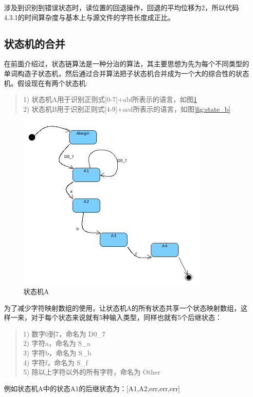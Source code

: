 涉及到识别到错误状态时，读位置的回退操作，回退的平均位移为2，所以代码4.3.1的时间算杂度与基本上与源文件的字符长度成正比。
  
\subsection{状态机的合并}
在前面介绍过，状态链算法是一种分治的算法，其主要思想为先为每个不同类型的单词构造子状态机，然后通过合并算法把子状态机合并成为一个大的综合性的状态机。假设现在有两个状态机:
\begin{quote}
1) 状态机A用于识别正则式[0-7]+abf所表示的语言，如图\ref{fig:state_a}\\
2) 状态机B用于识别正则式[4-9]+acd所表示的语言，如图\ref{fig:state_b}
\end{quote}
\begin{figure}
 \centering
 \includegraphics[scale=1]{s_a.png}
 \caption{状态机A}
 \label{fig:state_a}
\end{figure}
为了减少字符映射数组的使用，让状态机A的所有状态共享一个状态映射数组，这样一来，对于每个状态来说就有5种输入类型，同样也就有5个后继状态：
\begin{quote}
1) 数字0到7，命名为 D0\_7  \\
2) 字符a，命名为 S\_a  \\
3) 字符b，命名为 S\_b \\
4) 字符f，命名为 S\_f \\
5) 除以上字符以外的所有字符，命名为 Other
\end{quote}
例如状态机A中的状态A1的后继状态为：[A1,A2,err,err,err] 

